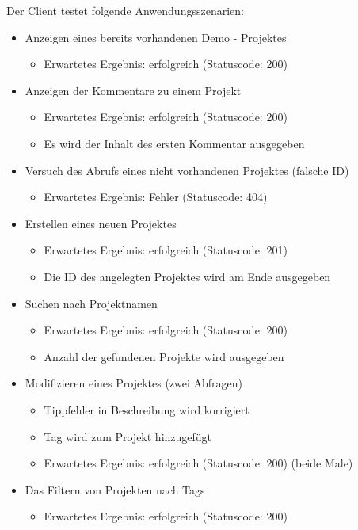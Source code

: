 \documentclass[150]{HSMW-Thesis}
\begin{document}
	Der Client testet folgende Anwendungsszenarien:
	\begin{itemize}
		\item Anzeigen eines bereits vorhandenen Demo - Projektes
		\begin{itemize}
			\item Erwartetes Ergebnis: erfolgreich (Statuscode: 200)
		\end{itemize}
		\item Anzeigen der Kommentare zu einem Projekt
		\begin{itemize}
			\item Erwartetes Ergebnis: erfolgreich (Statuscode: 200)
			\item Es wird der Inhalt des ersten Kommentar ausgegeben
		\end{itemize}
		\item Versuch des Abrufs eines nicht vorhandenen Projektes (falsche ID)
		\begin{itemize}
			\item Erwartetes Ergebnis: Fehler (Statuscode: 404)
		\end{itemize}
		\item Erstellen eines neuen Projektes
		\begin{itemize}
			\item Erwartetes Ergebnis: erfolgreich (Statuscode: 201)
			\item Die ID des angelegten Projektes wird am Ende ausgegeben
		\end{itemize}
		\item Suchen nach Projektnamen
		\begin{itemize}
			\item Erwartetes Ergebnis: erfolgreich (Statuscode: 200)
			\item Anzahl der gefundenen Projekte wird ausgegeben
		\end{itemize}
		\item Modifizieren eines Projektes (zwei Abfragen)
		\begin{itemize}
			\item Tippfehler in Beschreibung wird korrigiert
			\item Tag wird zum Projekt hinzugefügt
			\item Erwartetes Ergebnis: erfolgreich (Statuscode: 200) (beide Male)
		\end{itemize}
		\item Das Filtern von Projekten nach Tags
		\begin{itemize}
			\item Erwartetes Ergebnis: erfolgreich (Statuscode: 200)

\end{itemize}
\end{itemize}
\end{document}
